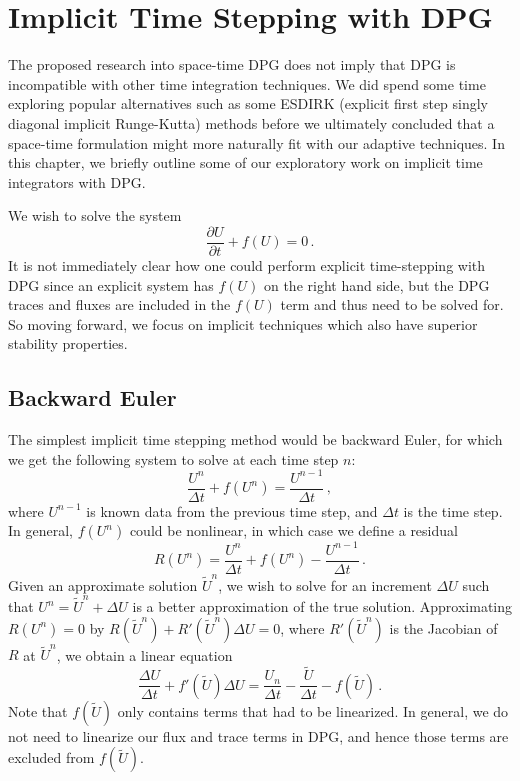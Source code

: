 \documentclass[Proposal.tex]{subfiles}
\begin{document}
\chapter{Implicit Time Stepping with DPG}
The proposed research into space-time DPG does not imply that DPG is incompatible with other time integration techniques. 
We did spend some time exploring popular alternatives such as some ESDIRK (explicit first step singly diagonal implicit Runge-Kutta) methods 
before we ultimately concluded that a space-time formulation might more naturally fit with our adaptive techniques.
In this chapter, we briefly outline some of our exploratory work on implicit time integrators with DPG.


We wish to solve the system
\[
\frac{\partial U}{\partial t}+f(U)=0\,.
\]
It is not immediately clear how one could perform explicit time-stepping with DPG since an explicit system has 
$f(U)$ on the right hand side, but the DPG traces and fluxes are included in the $f(U)$ term and thus need to be solved for.
So moving forward, we focus on implicit techniques which also have superior stability properties.

\section{Backward Euler}
The simplest implicit time stepping method would be backward Euler, for which we get the following system to solve at each time step $n$:
\begin{equation}
	\frac{U^{n}}{\Delta t}+f(U^{n})=\frac{U^{n-1}}{\Delta t}\,,
\end{equation}
where $U^{n-1}$ is known data from the previous time step, and $\Delta t$ is the time step. 
In general, $f(U^n)$ could be nonlinear, in which case we define a residual
\begin{equation}
	R(U^n)=\frac{U^n}{\Delta t}+f(U^n)-\frac{U^{n-1}}{\Delta t}\,.
\end{equation}
Given an approximate solution $\tilde U^n$, we wish to solve for an increment $\Delta U$ such that $U^n=\tilde U^n+\Delta U$ is a better approximation of the true solution.
Approximating $R(U^n)=0$ by $R(\tilde U^n)+R'(\tilde U^n)\Delta U=0$, where $R'(\tilde U^n)$ is the Jacobian of $R$ at $\tilde U^n$, we obtain a linear equation
\begin{equation}
\frac{\Delta U}{\Delta t}+f'(\tilde U)\Delta U
=\frac{U_n}{\Delta t}-\frac{\tilde U}{\Delta t}
-f(\tilde U)\,.
\end{equation}
Note that $f(\tilde U)$ only contains terms that had to be linearized. In general, we do not need to linearize our flux and trace terms in DPG, and hence those terms are excluded from $f(\tilde U)$.
\end{document}
